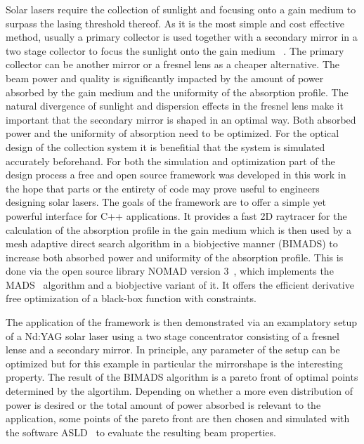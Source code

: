 \documentclass[a4paper,10pt]{article}
\begin{document}
    Solar lasers require the collection of sunlight and focusing
    onto a gain medium to surpass the lasing threshold thereof.
    As it is the most simple and cost effective method, usually
    a primary collector is used together with a secondary mirror in a 
    two stage collector to focus the sunlight onto the gain medium
    ~\cite{solar_lasers_magnesium}.
    The primary collector can be another mirror or a fresnel lens
    as a cheaper alternative.
    The beam power and quality is significantly impacted by the
    amount of power absorbed by the gain medium and the uniformity
    of the absorption profile.
    The natural divergence of sunlight and dispersion effects in the
    fresnel lens make it important that the secondary mirror is shaped
    in an optimal way.
    Both absorbed power and the uniformity of absorption need to be
    optimized.
    For the optical design of the collection system it is benefitial
    that the system is simulated accurately beforehand.
    For both the simulation and optimization part of the design process
    a free and open source framework was developed in this work in the
    hope that parts or the entirety of code may prove useful to engineers
    designing solar lasers.
    The goals of the framework are to offer a simple yet powerful interface
    for C++ applications.
    It provides a fast 2D raytracer for the calculation of the
    absorption profile in the gain medium which is then used by a
    mesh adaptive direct search algorithm in a biobjective manner (BIMADS) 
    to increase both absorbed power and uniformity of the absorption profile.
    This is done via the open source library NOMAD version 3~\cite{nomad3},
    which implements the MADS~\cite{mads_original} algorithm and a biobjective
    variant of it. 
    It offers the efficient derivative free optimization of a black-box
    function with constraints.

    The application of the framework is then demonstrated via an examplatory
    setup of a Nd:YAG solar laser using a two stage concentrator consisting
    of a fresnel lense and a secondary mirror.
    In principle, any parameter of the setup can be optimized but for this
    example in particular the mirrorshape is the interesting property. 
    The result of the BIMADS algorithm is a pareto front of optimal points 
    determined by the algortihm.
    Depending on whether a more even distribution of power is desired or
    the total amount of power absorbed is relevant to the application,
    some points of the pareto front are then chosen and simulated with
    the software ASLD~\cite{asld_website} to evaluate the resulting beam properties.
\end{document}
